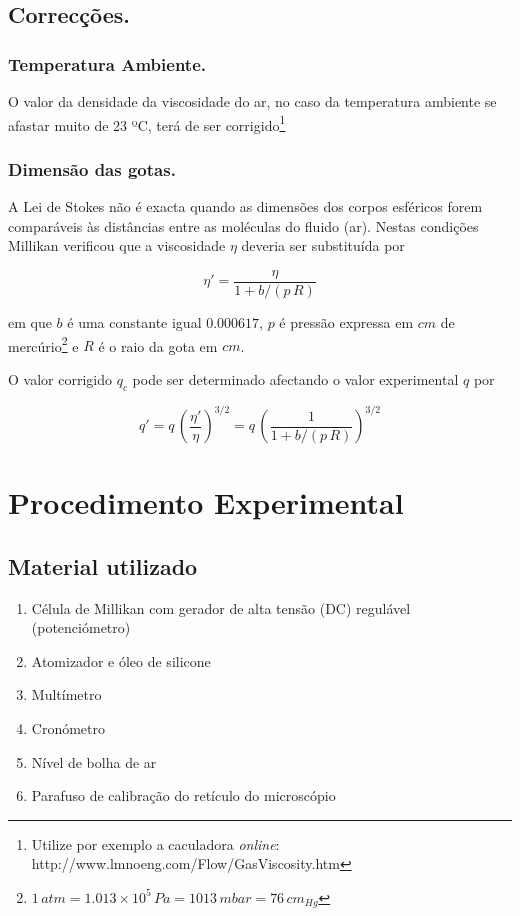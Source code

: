 \documentclass[a4paper,twoside,12pt]{article}      %
\begin{document}
\subsection{\sf Correcções.}
\subsubsection{\sf Temperatura Ambiente.}

O valor da densidade da viscosidade do ar, no caso da temperatura ambiente se afastar muito de 23 ºC, terá de ser corrigido\footnote{Utilize por exemplo a caculadora \emph{online}: http://www.lmnoeng.com/Flow/GasViscosity.htm}

\subsubsection{\sf Dimensão das gotas.}

A Lei de Stokes não é exacta quando as dimensões dos corpos esféricos forem comparáveis às distâncias entre as moléculas do fluido (ar).
Nestas condições Millikan verificou que a viscosidade $\eta$ deveria ser substituída por

\begin{equation}
	\label{eq:correcao}
	\eta' = \frac{\eta}{1 + b/(p\,R)}  
\end{equation}

em que $b$ é uma constante igual $0.000617$, $p$ é pressão expressa em $cm$ de mercúrio\footnote{$1\,atm  = 1.013 \times 10^5 \,Pa = 1013 \, mbar = 76\, cm_{Hg}$}  e $R$ é o raio da gota em $cm$.

O valor corrigido $q_c$ pode ser determinado afectando o valor experimental $q$ por

\begin{equation}
	\label{eq:correcao1}
	q ' = q\, \left(\frac{\eta'}{\eta}\right)^{3/2}  =q\, \left(\frac{1}{1 + b/(p\,R)}\right)^{3/2}  
\end{equation}

\newpage
\section{\sf Procedimento Experimental}

\subsection{\sf Material utilizado}

\begin{enumerate}
	\item Célula de Millikan com gerador de alta tensão (DC) regulável (potenciómetro) 
	\item  Atomizador e óleo de silicone 
	\item Multímetro 
	\item Cronómetro 
	\item Nível de bolha de ar 
	\item Parafuso de calibração do retículo do microscópio
\end{enumerate}
\end{document}
